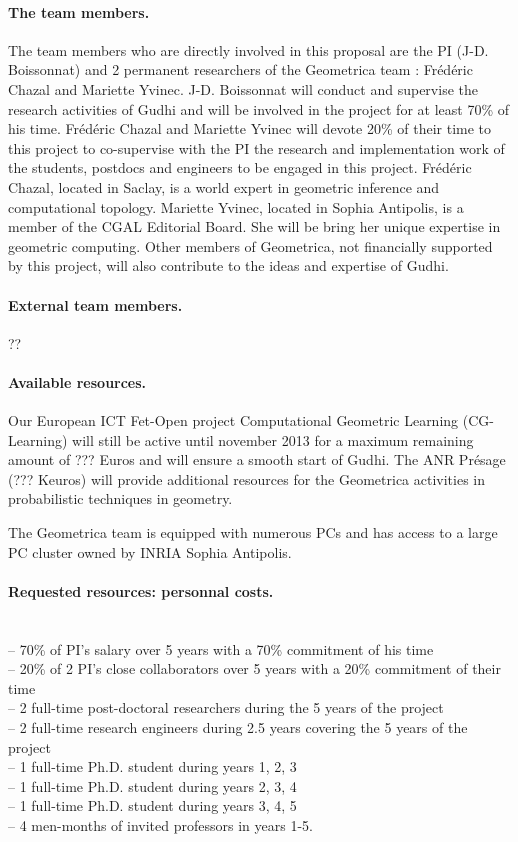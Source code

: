 \paragraph{The team members.}
The team members who are directly involved in this proposal are the PI (J-D. Boissonnat) and 2 permanent researchers of the Geometrica team : Fr\'ed\'eric Chazal and Mariette Yvinec.  J-D. Boissonnat will conduct and supervise the research activities of Gudhi and will be involved in the project for at least 70\% of his time.  Fr\'ed\'eric Chazal and Mariette Yvinec will devote 20\% of their time to this project to co-supervise with the PI the research and implementation work of the students, postdocs and engineers to be engaged in this project. Fr\'ed\'eric Chazal, located in Saclay,  is a world expert in geometric inference and computational topology. Mariette Yvinec, located in Sophia Antipolis,  is a member of the CGAL Editorial Board. She  will be bring her unique expertise in geometric computing. Other members of Geometrica, not financially supported by this project, will also contribute to the ideas and expertise of Gudhi.

\paragraph{External team members.} ??

\paragraph{Available resources.} Our European ICT Fet-Open project Computational Geometric Learning (CG-Learning) will still be active until november 2013 for a maximum remaining amount of ??? Euros and will ensure a smooth start of Gudhi.  The ANR Pr\'esage (??? Keuros) will provide additional resources for the Geometrica activities in probabilistic techniques in geometry.

The Geometrica team is equipped with numerous PCs and has access to a large PC cluster owned by INRIA Sophia Antipolis.

\paragraph{Requested resources: personnal costs.}\mbox{}\\
-- 70\% of PI's salary over 5 years with a 70\% commitment of his time\\
-- 20\% of 2 PI's close collaborators over 5 years with a 20\% commitment of their time\\
-- 2 full-time post-doctoral researchers during the 5 years of the project\\
-- 2 full-time research engineers during 2.5 years covering the 5 years of the project\\
-- 1 full-time Ph.D. student during years 1, 2, 3\\
-- 1 full-time Ph.D. student during years 2, 3, 4\\
-- 1 full-time Ph.D. student during years 3, 4, 5\\
-- 4 men-months of invited professors in years 1-5.

